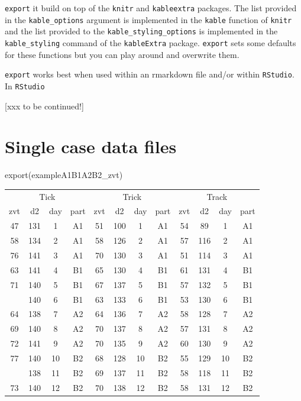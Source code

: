 \documentclass[
]{book}
\newenvironment{Shaded}{\begin{snugshade}}{\end{snugshade}}
\newcommand{\FunctionTok}[1]{\textcolor[rgb]{0.00,0.00,0.00}{#1}}
\newcommand{\NormalTok}[1]{#1}
\begin{document}
\begin{rmdnote}
\texttt{export} it build on top of the \texttt{knitr} and
\texttt{kableextra} packages. The list provided in the
\texttt{kable\_options} argument is implemented in the \texttt{kable}
function of \texttt{knitr} and the list provided to the
\texttt{kable\_styling\_options} is implemented in the
\texttt{kable\_styling} command of the \texttt{kableExtra} package.
\texttt{export} sets some defaults for these functions but you can play
around and overwrite them.
\end{rmdnote}

\texttt{export} works best when used within an rmarkdown file and/or within \texttt{RStudio}.\\
In \texttt{RStudio}

{[}xxx to be continued!{]}

\hypertarget{single-case-data-files}{%
\section{Single case data files}\label{single-case-data-files}}

\begin{Shaded}
\begin{Highlighting}[]
\FunctionTok{export}\NormalTok{(exampleA1B1A2B2\_zvt)}
\end{Highlighting}
\end{Shaded}

\begin{table}
\centering
\begin{tabular}{cccccccccccc}
\toprule
\multicolumn{4}{c}{Tick} & \multicolumn{4}{c}{Trick} & \multicolumn{4}{c}{Track} \\
\cmidrule(l{3pt}r{3pt}){1-4} \cmidrule(l{3pt}r{3pt}){5-8} \cmidrule(l{3pt}r{3pt}){9-12}
zvt & d2 & day & part & zvt & d2 & day & part & zvt & d2 & day & part\\
\midrule
47 & 131 & 1 & A1 & 51 & 100 & 1 & A1 & 54 & 89 & 1 & A1\\
58 & 134 & 2 & A1 & 58 & 126 & 2 & A1 & 57 & 116 & 2 & A1\\
76 & 141 & 3 & A1 & 70 & 130 & 3 & A1 & 51 & 114 & 3 & A1\\
63 & 141 & 4 & B1 & 65 & 130 & 4 & B1 & 61 & 131 & 4 & B1\\
71 & 140 & 5 & B1 & 67 & 137 & 5 & B1 & 57 & 132 & 5 & B1\\
\addlinespace
59 & 140 & 6 & B1 & 63 & 133 & 6 & B1 & 53 & 130 & 6 & B1\\
64 & 138 & 7 & A2 & 64 & 136 & 7 & A2 & 58 & 128 & 7 & A2\\
69 & 140 & 8 & A2 & 70 & 137 & 8 & A2 & 57 & 131 & 8 & A2\\
72 & 141 & 9 & A2 & 70 & 135 & 9 & A2 & 60 & 130 & 9 & A2\\
77 & 140 & 10 & B2 & 68 & 128 & 10 & B2 & 55 & 129 & 10 & B2\\
\addlinespace
76 & 138 & 11 & B2 & 69 & 137 & 11 & B2 & 58 & 118 & 11 & B2\\
73 & 140 & 12 & B2 & 70 & 138 & 12 & B2 & 58 & 131 & 12 & B2\\
\bottomrule
\end{tabular}
\end{table}
\end{document}

